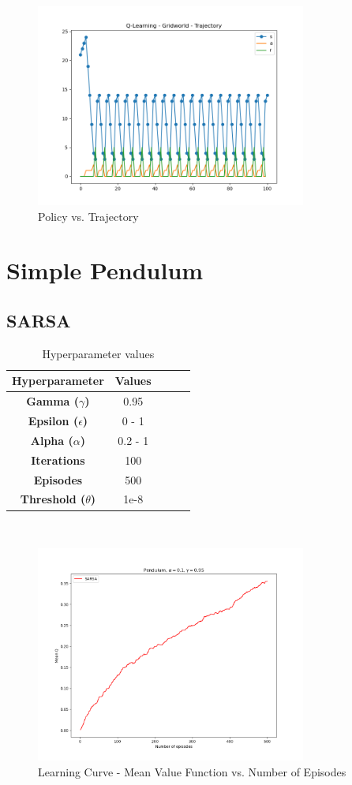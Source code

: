 \documentclass[conference]{IEEEtran}
\begin{document}
\begin{figure}[!htbp]
\centerline{\includegraphics[width=3.5in]{g_ql_policy_vs_trajec}}
\caption{Policy vs. Trajectory}
\label{fig}
\end{figure}
\FloatBarrier

\section{Simple Pendulum}

\subsection{SARSA}

\begin{table}[h]
\caption{Hyperparameter values}
\renewcommand{\arraystretch}{1.5}
\centering
\begin{tabular}{|c|c|c|c|c|}
\hline
\textbf{Hyperparameter} &  \textbf{Values}  \\ \hline
\textbf{Gamma ($\gamma$)} & 0.95  \\ \hline
\textbf{Epsilon ($\epsilon$)} & 0 - 1  \\ \hline
\textbf{Alpha ($\alpha$)} & 0.2 - 1  \\ \hline
\textbf{Iterations} & 100 \\ \hline
\textbf{Episodes} & 500  \\ \hline
\textbf{Threshold ($\theta$)} & 1e-8 \\ \hline
\end{tabular} \\
\label{tab:hyperparameters}
\end{table}

\begin{figure}[!htbp]
\centerline{\includegraphics[width=3.5in]{p_sarsa_learning_curve}}
\caption{Learning Curve - Mean Value Function vs. Number of Episodes}
\label{fig}
\end{figure}
\FloatBarrier
\end{document}
